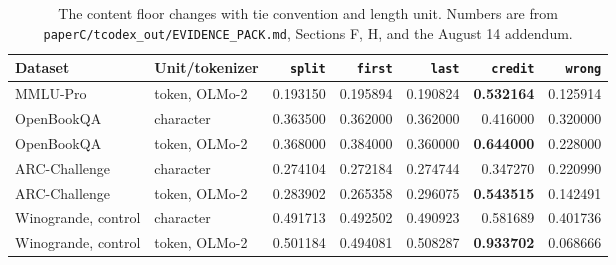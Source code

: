 \begin{table}[t]
\centering
\small
\setlength{\tabcolsep}{4.5pt}
\begin{tabular}{llrrrrr}
\toprule
Dataset & Unit/tokenizer & \texttt{split} & \texttt{first} & \texttt{last} & \texttt{credit} & \texttt{wrong} \\
\midrule
MMLU-Pro & token, OLMo-2 & 0.193150 & 0.195894 & 0.190824 & \textbf{0.532164} & 0.125914 \\
OpenBookQA & character & 0.363500 & 0.362000 & 0.362000 & 0.416000 & 0.320000 \\
OpenBookQA & token, OLMo-2 & 0.368000 & 0.384000 & 0.360000 & \textbf{0.644000} & 0.228000 \\
ARC-Challenge & character & 0.274104 & 0.272184 & 0.274744 & 0.347270 & 0.220990 \\
ARC-Challenge & token, OLMo-2 & 0.283902 & 0.265358 & 0.296075 & \textbf{0.543515} & 0.142491 \\
Winogrande, control & character & 0.491713 & 0.492502 & 0.490923 & 0.581689 & 0.401736 \\
Winogrande, control & token, OLMo-2 & 0.501184 & 0.494081 & 0.508287 & \textbf{0.933702} & 0.068666 \\
\bottomrule
\end{tabular}
\caption{The content floor changes with tie convention and length unit. Numbers are from \texttt{paperC/tcodex\_out/EVIDENCE\_PACK.md}, Sections F, H, and the August 14 addendum.}
\label{tab:conventions}
\end{table}
